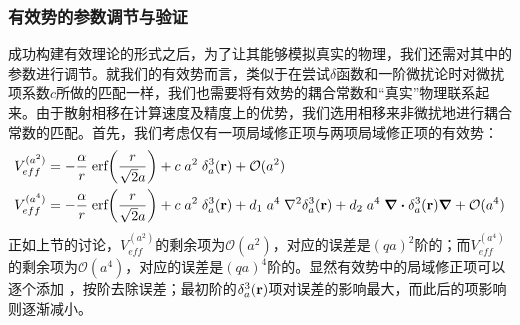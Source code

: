 \documentclass[cs4size,titlepage,twoside]{ctexart}
\begin{document}
\subsubsection{有效势的参数调节与验证}
成功构建有效理论的形式之后，为了让其能够模拟真实的物理，我们还需对其中的参数进行调节。就我们的有效势而言，类似于在尝试$\delta$函数和一阶微扰论时对微扰项系数$c$所做的匹配一样，我们也需要将有效势的耦合常数和“真实”物理联系起来。由于散射相移在计算速度及精度上的优势，我们选用相移来非微扰地进行耦合常数的匹配。首先，我们考虑仅有一项局域修正项与两项局域修正项的有效势：
\begin{align}
	\label{Veffa2}
	V_{eff}^{(a^2)} & =-\frac{\alpha}{r}\;\text{erf}\pqty{\frac{r}{\sqrt{2}a}}+c\; a^2\;\delta_a^3(\vb{r})+\mathcal{O}(a^2)                                                                                  \\
	\label{Veffa4}
	V_{eff}^{(a^4)} & =-\frac{\alpha}{r}\;\text{erf}\pqty{\frac{r}{\sqrt{2}a}}+c\; a^2\;\delta_a^3(\vb{r})+d_1\;a^4\;\laplacian{\delta_a^3(\vb{r})}+d_2\;a^4\;\div{\delta_a^3(\vb{r})}\grad+\mathcal{O}(a^4)
\end{align}
正如上节的讨论，$V_{eff}^{(a^2)}$的剩余项为$\mathcal{O}(a^2)$，对应的误差是$(qa)^2$阶的；而$V_{eff}^{(a^4)}$的剩余项为$\mathcal{O}(a^4)$，对应的误差是$(qa)^4$阶的。显然有效势中的局域修正项可以逐个添加 ，按阶去除误差；最初阶的$\delta_a^3(\vb{r})$项对误差的影响最大，而此后的项影响则逐渐减小。
\end{document}
